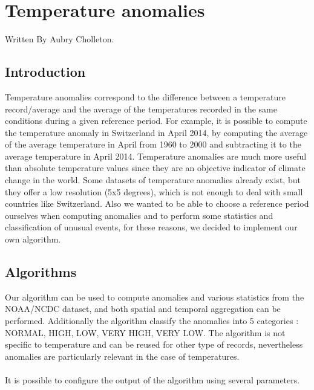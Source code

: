 \section{Temperature anomalies}
Written By Aubry Cholleton.
\subsection{Introduction}

Temperature anomalies correspond to the difference between a temperature record/average
and the average of the temperatures recorded in the same conditions during a given reference period.
For example, it is possible to compute the temperature anomaly in Switzerland in April 2014, by
computing the average of the average temperature in April from 1960 to 2000 and subtracting it to the
average temperature in April 2014. Temperature anomalies are much more useful than absolute temperature values since
 they are an objective indicator of climate change in the world.
Some datasets of temperature anomalies already exist, but they offer a
low resolution (5x5 degrees), which is not enough to deal with small countries like Switzerland.
Also we wanted to be able to choose a reference period ourselves when computing anomalies and to perform some statistics and classification of unusual events, for these reasons,
we decided to implement our own algorithm.

\subsection{Algorithms}

Our algorithm can be used to compute anomalies and various statistics from the NOAA/NCDC dataset, and both spatial and temporal aggregation
can be performed. Additionally the algorithm classify the anomalies into 5 categories : NORMAL, HIGH, LOW, VERY HIGH, VERY LOW.
The algorithm is not specific to temperature and can be reused for other type of records, nevertheless anomalies are particularly relevant in the case of temperatures.\\
\\It is possible to configure the output of the algorithm using several parameters.

